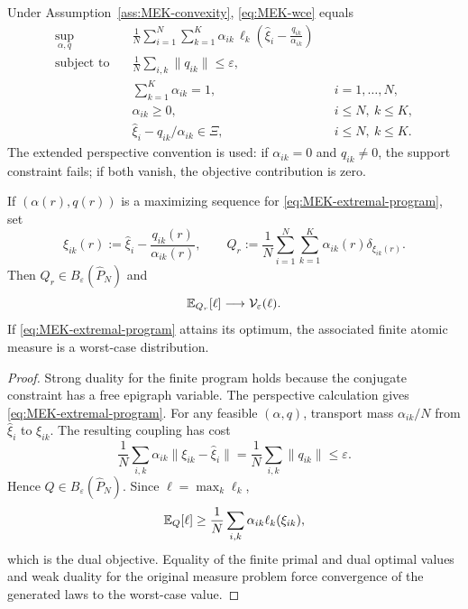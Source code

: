 \begin{theorem}\label{thm:MEK-worst-case-laws}
Under Assumption~\ref{ass:MEK-convexity}, \eqref{eq:MEK-wce} equals
\begin{equation}\label{eq:MEK-extremal-program}
\begin{aligned}
 \sup_{\alpha,q}\quad
 &\frac1N\sum_{i=1}^N\sum_{k=1}^K
 \alpha_{ik}\,
 \ell_k\!\left(\widehat\xi_i-\frac{q_{ik}}{\alpha_{ik}}\right)\\
 \text{subject to}\quad
 &\frac1N\sum_{i,k}\|q_{ik}\|\le\varepsilon,\\
 &\sum_{k=1}^K\alpha_{ik}=1,
 &&i=1,\dots,N,\\
 &\alpha_{ik}\ge0,
 &&i\le N,\ k\le K,\\
 &\widehat\xi_i-q_{ik}/\alpha_{ik}\in\Xi,
 &&i\le N,\ k\le K.
\end{aligned}
\end{equation}
The extended perspective convention is used: if $\alpha_{ik}=0$ and $q_{ik}\ne0$, the support constraint fails; if both vanish, the objective contribution is zero.

If $(\alpha(r),q(r))$ is a maximizing sequence for \eqref{eq:MEK-extremal-program}, set
\[
 \xi_{ik}(r):=\widehat\xi_i-\frac{q_{ik}(r)}{\alpha_{ik}(r)},
 \qquad
 Q_r:=\frac1N\sum_{i=1}^N\sum_{k=1}^K
 \alpha_{ik}(r)\delta_{\xi_{ik}(r)}.
\]
Then $Q_r\in B_\varepsilon(\widehat P_N)$ and
\[
 \mathbb{E}_{Q_r}[\ell]\longrightarrow\mathcal V_\varepsilon(\ell).
\]
If \eqref{eq:MEK-extremal-program} attains its optimum, the associated finite atomic measure is a worst-case distribution.
\end{theorem}

\begin{proof}
Strong duality for the finite program holds because the conjugate constraint has a free epigraph variable.  The perspective calculation gives \eqref{eq:MEK-extremal-program}.  For any feasible $(\alpha,q)$, transport mass $\alpha_{ik}/N$ from $\widehat\xi_i$ to $\xi_{ik}$.  The resulting coupling has cost
\[
 \frac1N\sum_{i,k}\alpha_{ik}
 \|\xi_{ik}-\widehat\xi_i\|
 =\frac1N\sum_{i,k}\|q_{ik}\|
 \le\varepsilon.
\]
Hence $Q\in B_\varepsilon(\widehat P_N)$.  Since $\ell=\max_k\ell_k$,
\[
 \mathbb{E}_Q[\ell]
 \ge\frac1N\sum_{i,k}
 \alpha_{ik}\ell_k(\xi_{ik}),
\]
which is the dual objective.  Equality of the finite primal and dual optimal values and weak duality for the original measure problem force convergence of the generated laws to the worst-case value.
\end{proof}

